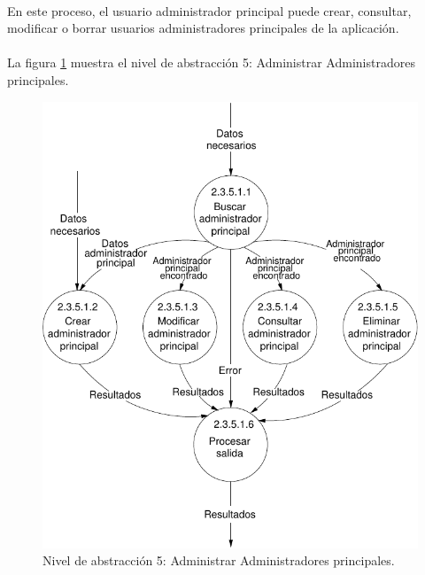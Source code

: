 \paragraph{}En este proceso, el usuario administrador principal puede crear,
consultar, modificar o borrar usuarios administradores principales de la
aplicación.

\paragraph{}La figura \ref{diagramaNivel5-AdministrarAdministradoresPrincipales}
muestra el nivel de abstracción 5: Administrar Administradores principales.

  \begin{figure}[!ht]
    \begin{center}
      \includegraphics[]{08.Analisis_Funcional/8.2.DFDs/Niveles/Nivel5/AdministradorPrincipal/AdministrarUsuarios/AdministrarAdministradoresPrincipales/Diagramas/nivel5-AdministrarAdministradoresPrincipales.pdf}
      \caption{Nivel de abstracción 5: Administrar Administradores principales.}
      \label{diagramaNivel5-AdministrarAdministradoresPrincipales}
    \end{center}
  \end{figure}
